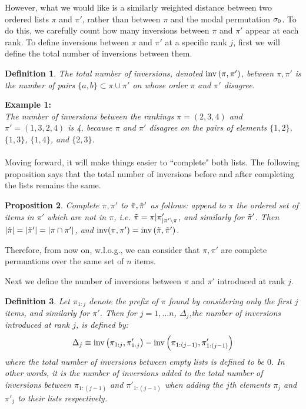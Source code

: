 \documentclass[10pt]{article}
\newtheorem{prop}{Proposition}
\newtheorem{definition}[prop]{Definition}
\newcommand\bl{\left(}
\newcommand\br{\right)}
\begin{document}
However, what we would like is a similarly weighted distance between two ordered lists $\pi$ and $\pi'$, rather than between $\pi$ and the modal permutation $\sigma_0$. To do this, we carefully count how many inversions between $\pi$ and $\pi'$ appear at each rank. To define inversions between $\pi$ and $\pi'$ at a specific rank $j$, first we will define the total number of inversions between them.

\begin{definition}
The total number of inversions, denoted $\inv\bl \pi, \pi' \br$, between $\pi,\pi'$ is the number of pairs $\{a,b\}\subset \pi \cup \pi'$ on whose order $\pi$ and $\pi'$ disagree. 
\end{definition}
\textbf{Example 1:}\\
\textit{The number of inversions between the rankings $\pi = (2,3,4)$ and $\pi' = (1,3,2,4)$ is 4, because $\pi$ and $\pi'$ disagree on the pairs of elements $\{ 1,2 \}$, $\{ 1,3 \}$, $\{1,4\}$, and $\{2,3\}$.}\\\\
Moving forward, it will make things easier to ``complete" both lists. The following proposition says that the total number of inversions before and after completing the lists remains the same.

\begin{prop}
    Complete $\pi,\pi'$ to $\tilde{\pi},\tilde{\pi}'$ as follows: append to $\pi$ the ordered set of items in $\pi'$ which are not in $\pi$, i.e. $\tilde{\pi}=\pi|\pi'_{|\pi'\setminus\pi}$, and similarly for $\tilde{\pi}'$. Then $|\tilde{\pi}|=|\tilde{\pi}'|=|\pi \cap \pi'|$, and $\inv(\pi,\pi') = \inv \bl \tilpi,\tilpi' \br$.
\end{prop}

Therefore, from now on, w.l.o.g., we can consider that $\pi,\pi'$ are complete permuations over the same set of $n$ items.

Next we define the number of inversions between $\pi$ and $\pi'$ introduced at rank $j$. 

\begin{definition}
    Let $\pi_{1:j}$ denote the prefix of $\pi$ found by considering only the first $j$ items, and similarly for $\pi'$. Then for $j=1, \ldots n$, $\Delta_j$,the number of inversions introduced at rank $j$, is defined by:
    \begin{equation}
        \Delta_j \equiv \inv \bl \pi_{1:j},\pi'_{1:j}\br - \inv \bl \pi_{1:(j-1)},\pi'_{1:(j-1)}\br
    \end{equation}
    where the total number of inversions between empty lists is defined to be $0$.
    In other words, it is the number of inversions added to the total number of inversions between $\pi_{1:(j-1)}$ and $\pi'_{1:(j-1)}$ when adding the $j$th elements $\pi_j$ and $\pi'_j$ to their lists respectively.
\end{definition}
\end{document}
